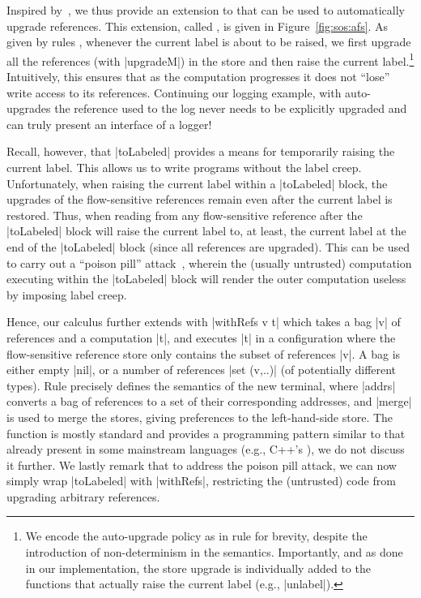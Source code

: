 Inspired by~\citep{Hedin13}, we thus provide an extension to \liofs{} that can
be used to automatically upgrade references.
%
This extension, called \lioafs{}, is given in Figure~\ref{fig:sos:afs}.
%
As given by rules , whenever the current label is about
to be raised, we first upgrade all the references (with |upgradeM|) in the
store and then raise the current label.\footnote{
We encode the auto-upgrade policy as in rule  for
brevity, despite the introduction of non-determinism in the semantics.
%
Importantly, and as done in our implementation, the store upgrade is
individually added to the functions that actually raise the current label
(e.g., |unlabel|).
}
%
Intuitively, this ensures that as the computation progresses it does not
``lose'' write access to its references.
%
Continuing our logging example, with auto-upgrades the reference used to the log
never needs to be explicitly upgraded and can truly present an interface of a
logger!

Recall, however, that |toLabeled| provides a means for temporarily raising the
current label.
%
This allows us to write programs without the label creep.
%
Unfortunately, when raising the current label within a |toLabeled| block, the
upgrades of the flow-sensitive references remain even after the current label
is restored.
%
Thus, when reading from any flow-sensitive reference after the |toLabeled|
block will raise the current label to, at least, the current label at the end
of the |toLabeled| block (since all references are upgraded).
%
This can be used to carry out a ``poison pill'' attack~, wherein
the (usually untrusted) computation executing within the |toLabeled| block will
render the outer computation useless by imposing label creep.

Hence, our \lioafs{} calculus further extends \liofs{} with |withRefs v t| which
takes a bag |v| of references and a computation |t|, and executes |t| in a
configuration where the flow-sensitive reference store only contains the subset
of references |v|.
%
A bag is either empty |nil|, or a number of references |set (v,..)| (of
potentially different types).
%
Rule  precisely defines the semantics of the new terminal,
where |addrs| converts a bag of references to a set of their corresponding
addresses, and |merge| is used to merge the stores, giving preferences to the
left-hand-side store.
%
The function is mostly standard and provides a programming pattern similar to
that already present in some mainstream languages (e.g., C++'s ),
we do not discuss it further.
%
We lastly remark that to address the poison pill attack, we can now simply wrap
|toLabeled| with |withRefs|, restricting the (untrusted) code from upgrading
arbitrary references.


